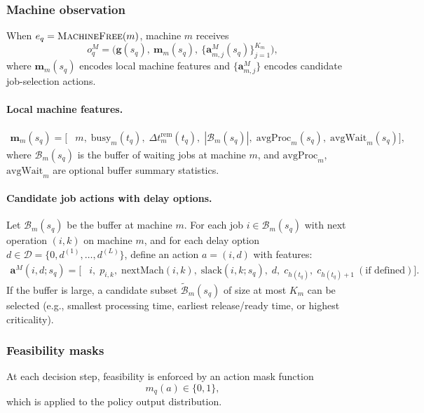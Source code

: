 \documentclass[preprint, 3p, review, 12pt]{elsarticle}
\begin{document}
\subsubsection{Machine observation}
When $e_q=\textsc{MachineFree}(m)$, machine $m$ receives
\[
o_q^{M} = \Big(\mathbf{g}(s_q),\ \mathbf{m}_m(s_q),\ \{\mathbf{a}^{M}_{m,j}(s_q)\}_{j=1}^{K_m}\Big),
\]
where $\mathbf{m}_m(s_q)$ encodes local machine features and $\{\mathbf{a}^{M}_{m,j}\}$ encodes candidate job-selection actions.

\paragraph{Local machine features.}
\begin{align}
\mathbf{m}_m(s_q)=
\Big[
&m,\;
\mathrm{busy}_m(t_q),\;
\Delta t^{\mathrm{rem}}_m(t_q),\;
|\mathcal{B}_m(s_q)|,\;
\mathrm{avgProc}_m(s_q),\;
\mathrm{avgWait}_m(s_q)
\Big],
\label{eq:machine_feat}
\end{align}
where $\mathcal{B}_m(s_q)$ is the buffer of waiting jobs at machine $m$, and $\mathrm{avgProc}_m$, $\mathrm{avgWait}_m$
are optional buffer summary statistics.

\paragraph{Candidate job actions with delay options.}
Let $\mathcal{B}_m(s_q)$ be the buffer at machine $m$. For each job $i\in\mathcal{B}_m(s_q)$ with next operation $(i,k)$ on machine $m$,
and for each delay option $d\in\mathcal{D}=\{0,d^{(1)},\dots,d^{(L)}\}$, define an action $a=(i,d)$ with features:
\begin{align}
\mathbf{a}^{M}(i,d;s_q)=
\Big[
&i,\;
p_{i,k},\;
\mathrm{nextMach}(i,k),\;
\mathrm{slack}(i,k;s_q),\;
d,\;
c_{h(t_q)},\;
c_{h(t_q)+1}\ (\text{if defined})
\Big].
\label{eq:machine_action_feat}
\end{align}
If the buffer is large, a candidate subset $\tilde{\mathcal{B}}_m(s_q)$ of size at most $K_m$ can be selected
(e.g., smallest processing time, earliest release/ready time, or highest criticality).

\subsubsection{Feasibility masks}
At each decision step, feasibility is enforced by an action mask function
\[
m_q(a)\in\{0,1\},
\]
which is applied to the policy output distribution.
\end{document}
